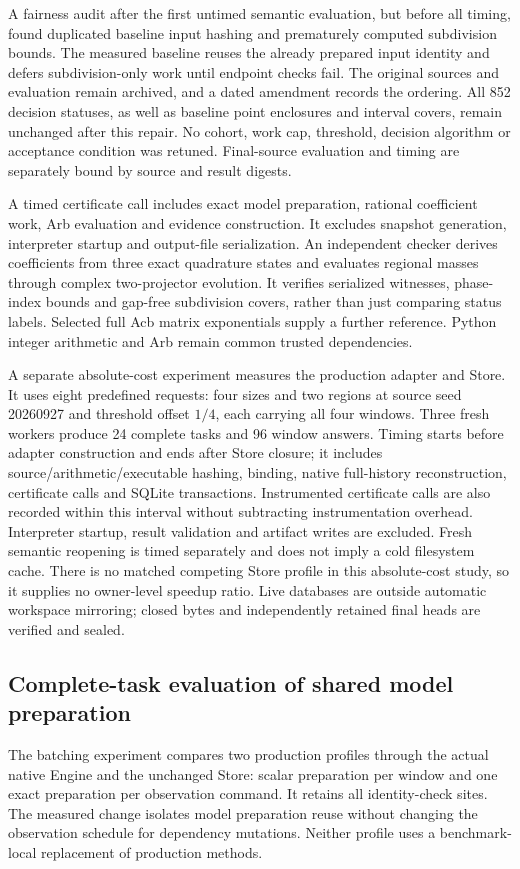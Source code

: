 \documentclass[11pt,a4paper]{article}
\theoremstyle{definition}\newtheorem{definition}[theorem]{Definition}
\begin{document}
A fairness audit after the first untimed semantic evaluation, but before all timing, found duplicated baseline input hashing and prematurely computed subdivision bounds. The measured baseline reuses the already prepared input identity and defers subdivision-only work until endpoint checks fail. The original sources and evaluation remain archived, and a dated amendment records the ordering. All 852 decision statuses, as well as baseline point enclosures and interval covers, remain unchanged after this repair. No cohort, work cap, threshold, decision algorithm or acceptance condition was retuned. Final-source evaluation and timing are separately bound by source and result digests.

A timed certificate call includes exact model preparation, rational coefficient work, Arb evaluation and evidence construction. It excludes snapshot generation, interpreter startup and output-file serialization. An independent checker derives coefficients from three exact quadrature states and evaluates regional masses through complex two-projector evolution. It verifies serialized witnesses, phase-index bounds and gap-free subdivision covers, rather than just comparing status labels. Selected full Acb matrix exponentials supply a further reference. Python integer arithmetic and Arb remain common trusted dependencies.

A separate absolute-cost experiment measures the production adapter and Store. It uses eight predefined requests: four sizes and two regions at source seed 20260927 and threshold offset $1/4$, each carrying all four windows. Three fresh workers produce 24 complete tasks and 96 window answers. Timing starts before adapter construction and ends after Store closure; it includes source/arithmetic/executable hashing, binding, native full-history reconstruction, certificate calls and SQLite transactions. Instrumented certificate calls are also recorded within this interval without subtracting instrumentation overhead. Interpreter startup, result validation and artifact writes are excluded. Fresh semantic reopening is timed separately and does not imply a cold filesystem cache. There is no matched competing Store profile in this absolute-cost study, so it supplies no owner-level speedup ratio. Live databases are outside automatic workspace mirroring; closed bytes and independently retained final heads are verified and sealed.

\subsection{Complete-task evaluation of shared model preparation}\label{sec:batchprotocol}
The batching experiment compares two production profiles through the actual native Engine and the unchanged Store: scalar preparation per window and one exact preparation per observation command. It retains all identity-check sites. The measured change isolates model preparation reuse without changing the observation schedule for dependency mutations. Neither profile uses a benchmark-local replacement of production methods.
\end{document}
